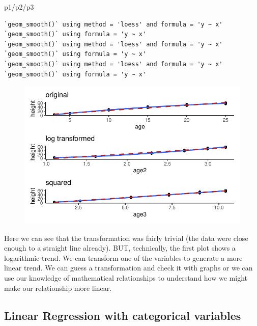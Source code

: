 \documentclass[
  letterpaper,
  DIV=11,
  numbers=noendperiod]{scrartcl}
\newenvironment{Shaded}{\begin{snugshade}}{\end{snugshade}}
\newcommand{\NormalTok}[1]{\textcolor[rgb]{0.00,0.23,0.31}{#1}}
\newcommand{\SpecialCharTok}[1]{\textcolor[rgb]{0.37,0.37,0.37}{#1}}
\begin{document}
\begin{Shaded}
\begin{Highlighting}[]
\NormalTok{p1}\SpecialCharTok{/}\NormalTok{p2}\SpecialCharTok{/}\NormalTok{p3}
\end{Highlighting}
\end{Shaded}

\begin{verbatim}
`geom_smooth()` using method = 'loess' and formula = 'y ~ x'
`geom_smooth()` using formula = 'y ~ x'
`geom_smooth()` using method = 'loess' and formula = 'y ~ x'
`geom_smooth()` using formula = 'y ~ x'
`geom_smooth()` using method = 'loess' and formula = 'y ~ x'
`geom_smooth()` using formula = 'y ~ x'
\end{verbatim}

\begin{figure}[H]

{\centering \includegraphics{cor_reg_chi_files/figure-pdf/unnamed-chunk-15-1.pdf}

}

\end{figure}

Here we can see that the transformation was fairly trivial (the data
were close enough to a straight line already). BUT, technically, the
first plot shows a logarithmic trend. We can transform one of the
variables to generate a more linear trend. We can guess a transformation
and check it with graphs or we can use our knowledge of mathematical
relationships to understand how we might make our relationship more
linear.

\subsection{\texorpdfstring{\textbf{Linear Regression with categorical
variables}}{Linear Regression with categorical variables}}
\end{document}
